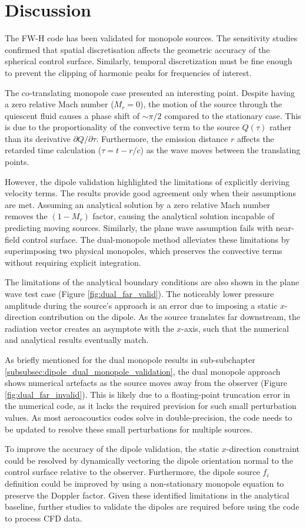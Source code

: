 \chapter{Discussion} \label{sec:discussion}

The FW-H code has been validated for monopole sources. The sensitivity studies confirmed that spatial discretisation affects the geometric accuracy of the spherical control surface. Similarly, temporal discretization must be fine enough to prevent the clipping of harmonic peaks for frequencies of interest.

The co-translating monopole case presented an interesting point. Despite having a zero relative Mach number ($M_r = 0$), the motion of the source through the quiescent fluid causes a phase shift of $\sim\pi/2$ compared to the stationary case. This is due to the proportionality of the convective term to the source $Q(\tau)$ rather than its derivative $\partial Q/\partial\tau$. Furthermore, the emission distance $r$ affects the retarded time calculation ($\tau = t - r/c$) as the wave moves between the translating points.

However, the dipole validation highlighted the limitations of explicitly deriving velocity terms. The results provide good agreement only when their assumptions are met. Assuming an analytical solution by a zero relative Mach number removes the $(1-M_r)$ factor, causing the analytical solution incapable of predicting moving sources. Similarly, the plane wave assumption fails with near-field control surface. The dual-monopole method alleviates these limitations by superimposing two physical monopoles, which preserves the convective terms without requiring explicit integration.

The limitations of the analytical boundary conditions are also shown in the plane wave test case (Figure \ref{fig:dual_far_valid}). The noticeably lower pressure amplitude  during the source's approach is an error due to imposing a static $x$-direction contribution on the dipole. As the source translates far downstream, the radiation vector creates an asymptote with the $x$-axis, such that the numerical and analytical results eventually match.

As briefly mentioned for the dual monopole results in sub-subchapter \ref{subsubsec:dipole_dual_monopole_validation}, the dual monopole approach shows numerical artefacts as the source moves away from the observer (Figure \ref{fig:dual_far_invalid}). This is likely due to a floating-point truncation error in the numerical code, as it lacks the required prevision for such small perturbation values. As most aeroacoustics codes solve in double-precision, the code needs to be updated to resolve these small perturbations for multiple sources.

To improve the accuracy of the dipole validation, the static $x$-direction constraint could be resolved by dynamically vectoring the dipole orientation normal to the control surface relative to the observer. Furthermore, the dipole source $f_i$ definition could be improved by using a non-stationary monopole equation to preserve the Doppler factor. Given these identified limitations in the analytical baseline, further studies to validate the dipoles are required before using the code to process CFD data.